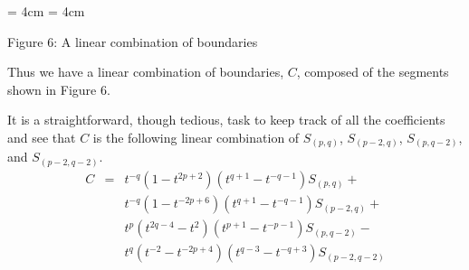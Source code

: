 \documentclass{slides}
\newtheorem{theorem}{Theorem}
\theoremstyle{definition}
\begin{document}

\begin{slide}

  \begin{center}
    \epsfxsize = 4cm
    \epsfysize = 4cm

Figure 6:  A linear combination of boundaries
  \end{center}

Thus we have a linear combination of boundaries, $C$, composed of the
segments shown in Figure 6.

It is a straightforward, though
tedious, task to keep track of all the coefficients and see that $C$
is the following linear combination of
$S_{(p,q)}$, $S_{(p-2,q)}$, $S_{(p,q-2)}$, and $S_{(p-2,q-2)}$.
\begin{eqnarray}
C & = & t^{-q}(1-t^{2p+2}) (t^{q+1} - t^{-q-1}) S_{(p,q)} + \nonumber \\
& &		t^{-q}(1-t^{-2p+6}) (t^{q+1} - t^{-q-1}) S_{(p-2,q)} + \nonumber \\
& &		t^{p}(t^{2q-4} - t^2) (t^{p+1} - t^{-p-1}) S_{(p, q-2)} - \nonumber \\
& &		t^{q}(t^{-2} - t^{-2p+4}) (t^{q-3} - t^{-q+3}) S_{(p-2,q-2)} \nonumber
\end{eqnarray}
\end{slide}



\end{document}
